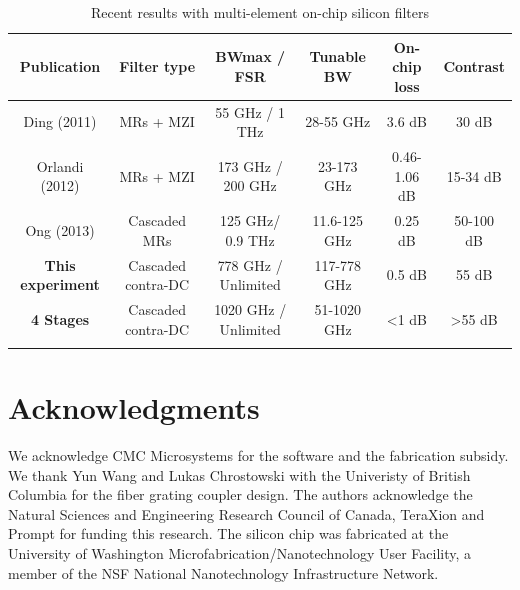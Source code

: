 \documentclass[9pt,twocolumn,twoside]{osajnl}
\begin{document}
\begin{table}[thb]
\caption{Recent results with multi-element on-chip silicon filters}
\begin{tabular}{cccccc}
    \hline
	Publication & Filter type & BWmax / FSR & Tunable BW & On-chip loss & Contrast \\
    \hline
    Ding (2011)\cite{ding2011bandwidth} &	MRs + MZI &	55 GHz / 1 THz &	28-55 GHz &	3.6 dB &	30 dB
     \\
 	Orlandi (2012)\cite{orlandi2012reconfigurable} &	MRs + MZI &	173 GHz / 200 GHz &	23-173 GHz &	0.46-1.06 dB &	15-34 dB
      \\
    Ong (2013)\cite{ong2013ultra} &	Cascaded MRs &	125 GHz/ 0.9 THz &	11.6-125 GHz &	0.25 dB &	50-100 dB
      \\
    \textbf{This experiment }& Cascaded contra-DC &	778 GHz / Unlimited  &	117-778 GHz &	0.5 dB &	55 dB 
    \\
    \textbf{4 Stages }& Cascaded contra-DC &	1020 GHz / Unlimited  &	51-1020 GHz &	<1 dB &	>55 dB 
    \\
    
    \hline
    \label{table:comparison}
   \end{tabular}
    \end{table}




\section*{Acknowledgments}
We acknowledge CMC Microsystems for the  software and the fabrication subsidy. We thank Yun Wang and Lukas Chrostowski with the Univeristy of British Columbia for the fiber grating coupler design. The authors acknowledge the Natural Sciences and Engineering Research Council of Canada, TeraXion and Prompt for funding this research. The silicon chip was fabricated at the University of Washington Microfabrication/Nanotechnology User Facility, a member of the NSF National Nanotechnology Infrastructure Network.



\end{document}
